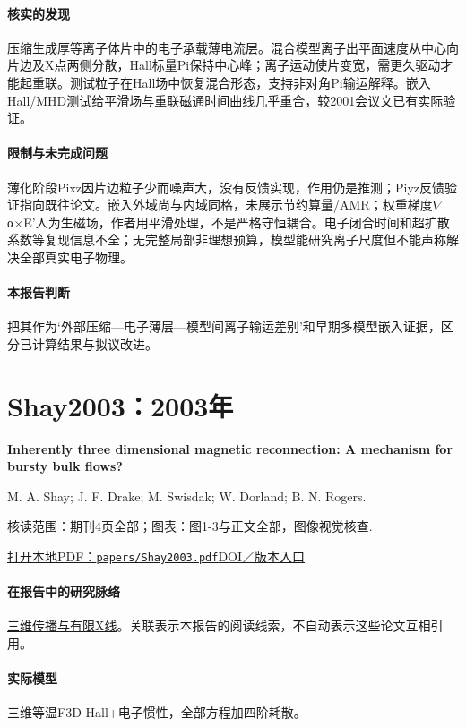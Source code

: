 \paragraph{核实的发现}压缩生成厚等离子体片中的电子承载薄电流层。混合模型离子出平面速度从中心向片边及X点两侧分散，Hall标量Pi保持中心峰；离子运动使片变宽，需更久驱动才能起重联。测试粒子在Hall场中恢复混合形态，支持非对角Pi输运解释。嵌入Hall/MHD测试给平滑场与重联磁通时间曲线几乎重合，较2001会议文已有实际验证。

\paragraph{限制与未完成问题}薄化阶段Pixz因片边粒子少而噪声大，没有反馈实现，作用仍是推测；Piyz反馈验证指向既往论文。嵌入外域尚与内域同格，未展示节约算量/AMR；权重梯度\ensuremath{\nabla}α×E'人为生磁场，作者用平滑处理，不是严格守恒耦合。电子闭合时间和超扩散系数等复现信息不全；无完整局部非理想预算，模型能研究离子尺度但不能声称解决全部真实电子物理。

\paragraph{本报告判断}把其作为‘外部压缩—电子薄层—模型间离子输运差别’和早期多模型嵌入证据，区分已计算结果与拟议改进。

\section{Shay2003：2003年}\label{paper:Shay2003}

\textbf{Inherently three dimensional magnetic reconnection: A mechanism for bursty bulk flows?}\citep{Shay2003}\

M. A. Shay;  J. F. Drake;  M. Swisdak;  W. Dorland;  B. N. Rogers.

\textsf{核读范围：}期刊4页全部；\textsf{图表：}图1-3与正文全部，图像视觉核查.

\href{run:papers/Shay2003.pdf}{打开本地PDF：\texttt{papers/Shay2003.pdf}}\quad\href{https://doi.org/10.1029/2002gl016267}{DOI／版本入口}

\paragraph{在报告中的研究脉络}\hyperref[story:three]{三维传播与有限X线}。关联表示本报告的阅读线索，不自动表示这些论文互相引用。

\paragraph{实际模型}三维等温F3D Hall+电子惯性，全部方程加四阶耗散。

